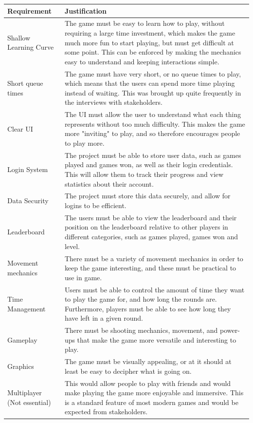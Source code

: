 \vs
\begin{center}
\begin{longtable}{|p{4cm}|p{11.5cm}|}
    \hline
     Requirement & Justification\\
    \hline
    \hline
    Shallow Learning Curve & The game must be easy to learn how to play, without requiring a large time investment, which makes the game much more fun to start playing, but must get difficult at some point. This can be enforced by making the mechanics easy to understand and keeping interactions simple.\\
    \hline
    Short queue times & The game must have very short, or no queue times to play, which means that the users can spend more time playing instead of waiting. This was brought up quite frequently in the interviews with stakeholders.\\
    \hline
    Clear UI & The UI must allow the user to understand what each thing represents without too much difficulty. This makes the game more "inviting" to play, and so therefore encourages people to play more.\\
    \hline
    Login System & The project must be able to store user data, such as games played and games won, as well as their login credentials. This will allow them to track their progress and view statistics about their account.\\
    \hline
    Data Security & The project must store this data securely, and allow for logins to be efficient.\\
    \hline
    Leaderboard & The users must be able to view the leaderboard and their position on the leaderboard relative to other players in different categories, such as games played, games won and level.\\
    \hline
    Movement mechanics & There must be a variety of movement mechanics in order to keep the game interesting, and these must be practical to use in game.\\
    \hline
    Time Management & Users must be able to control the amount of time they want to play the game for, and how long the rounds are. Furthermore, players must be able to see how long they have left in a given round.\\
    \hline 
    Gameplay & There must be shooting mechanics, movement, and power-ups that make the game more versatile and interesting to play.\\
    \hline
    Graphics & The game must be visually appealing, or at it should at least be easy to decipher what is going on.\\
    \hline
    Multiplayer (Not essential) & This would allow people to play with friends and would make playing the game more enjoyable and immersive. This is a standard feature of most modern games and would be expected from stakeholders.\\
    \hline
\end{longtable}
\end{center}

